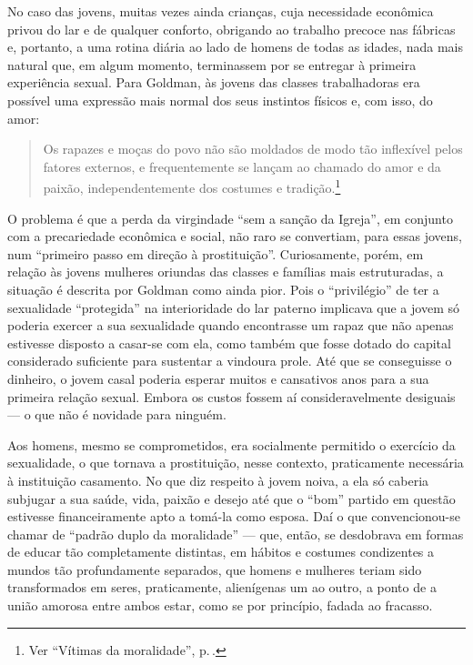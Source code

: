No caso das jovens, muitas vezes ainda crianças, cuja necessidade
econômica privou do lar e de qualquer conforto, obrigando ao trabalho
precoce nas fábricas e, portanto, a uma rotina diária ao lado de homens
de todas as idades, nada mais natural que, em algum momento, terminassem
por se entregar à primeira experiência sexual. Para Goldman, às jovens
das classes trabalhadoras era possível uma expressão mais normal dos
seus instintos físicos e, com isso, do amor:

\begin{quote}
Os rapazes e moças do povo não são moldados de modo
tão inflexível pelos fatores externos, e frequentemente se lançam ao
chamado do amor e da paixão, independentemente dos costumes e tradição.\footnote{Ver ``Vítimas da moralidade'', p.\,\pageref{tradicao}.}
\end{quote}

O problema é que a perda da virgindade ``sem a sanção da
Igreja'', em conjunto com a precariedade econômica e social, não raro se
convertiam, para essas jovens, num ``primeiro passo em direção à
prostituição''. Curiosamente, porém, em relação às jovens
mulheres oriundas das classes e famílias mais estruturadas, a situação é
descrita por Goldman como ainda pior. Pois o ``privilégio'' de ter a
sexualidade ``protegida'' na interioridade do lar paterno implicava que
a jovem só poderia exercer a sua sexualidade quando
encontrasse um rapaz que não apenas estivesse disposto a casar-se com
ela, como também que fosse dotado do capital considerado
suficiente para sustentar a vindoura prole. Até que se conseguisse o
dinheiro, o jovem casal poderia esperar muitos e
cansativos anos para a sua primeira relação sexual. Embora os
custos fossem aí consideravelmente desiguais --- o que não é novidade
para ninguém.

Aos homens, mesmo se comprometidos, era socialmente
permitido o exercício da sexualidade, o que tornava a prostituição,
nesse contexto, praticamente necessária à instituição
casamento. No que diz respeito à jovem noiva, a ela só caberia subjugar
a sua saúde, vida, paixão e desejo até que o ``bom'' partido em questão
estivesse financeiramente apto a tomá-la como esposa. Daí o que
convencionou-se chamar de ``padrão duplo da moralidade'' --- que, então,
se desdobrava em formas de educar tão completamente distintas, em
hábitos e costumes condizentes a mundos tão profundamente separados, que
homens e mulheres teriam sido transformados em seres, praticamente,
alienígenas um ao outro, a ponto de a união amorosa entre ambos estar,
como se por princípio, fadada ao fracasso.

